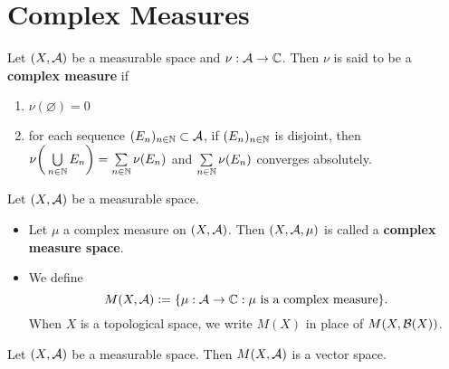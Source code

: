 \documentclass{book}
\begin{document}
	
	
	
	
	
	
	
	
	\newpage	
	\section{Complex Measures}
	
	\begin{defn}  
		Let $(X, \mathcal{A})$ be a measurable space and $\nu:\mathcal{A} \rightarrow \mathbb{C}$. Then $\nu$ is said to be a \textbf{complex measure} if 
		\begin{enumerate}
			\item $\nu (\varnothing) = 0$
			\item for each sequence $(E_n)_{n \in \mathbb{N}} \subset \mathcal{A}$, if $(E_n)_{n \in \mathbb{N}}$ is disjoint, then $\nu \bigg( \bigcup\limits_{n \in \mathbb{N}} E_n \bigg) = \sum\limits_{n \in \mathbb{N}} \nu(E_n)$ and $\sum\limits_{n \in \mathbb{N}} \nu(E_n)$ converges absolutely. 
		\end{enumerate}
	\end{defn}

	\begin{defn}  
	Let $(X, \mathcal{A})$ be a measurable space. 
	\begin{itemize}
		\item Let $\mu$ a complex measure on $(X, \mathcal{A})$. Then $(X, \mathcal{A}, \mu)$ is called a \textbf{complex measure space}. 
		\item We define 
		$$M(X, \mathcal{A}) \vcentcolon= \{\mu:\mathcal{A} \rightarrow \mathbb{C}: \mu \text{ is a complex measure}\}.$$ 
		When $X$ is a topological space, we write $M(X)$ in place of $M(X, \mathcal{B}(X))$.
	\end{itemize}
	\end{defn}

	\begin{ex}  
		Let $(X, \mathcal{A})$ be a measurable space. Then $M(X, \mathcal{A})$ is a vector space.
	\end{ex}
\end{document}
